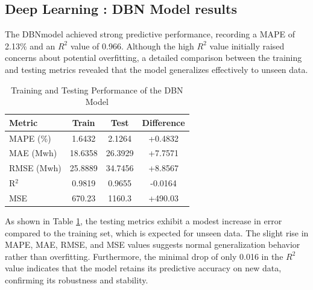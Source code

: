  \subsection{Deep Learning : DBN Model results \label{sec:dbn results}}
 The DBNmodel achieved strong predictive performance, recording a MAPE of 2.13\% and an $R^2$ value of 0.966. Although the high $R^2$ value initially raised concerns about potential overfitting, a detailed comparison between the training and testing metrics revealed that the model generalizes effectively to unseen data.
 \begin{table}[h!]
 	\centering
 	\caption{Training and Testing Performance of the DBN Model}
 	\label{tab:dbn_performance}
 	\begin{tabular}{lccc}
 		\hline
 		\textbf{Metric} & \textbf{Train} & \textbf{Test} & \textbf{Difference} \\ \hline
 		MAPE (\%) & 1.6432 & 2.1264 & +0.4832 \\
 		MAE (Mwh) & 18.6358 & 26.3929 & +7.7571 \\
 		RMSE (Mwh) & 25.8889 & 34.7456 & +8.8567 \\
 		R$^2$ & 0.9819 & 0.9655 & -0.0164 \\
 		MSE & 670.23 & 1160.3 & +490.03 \\ \hline
 	\end{tabular}
 \end{table}
  As shown in Table \ref{tab:dbn_performance}, the testing metrics exhibit a modest increase in error compared to the training set, which is expected for unseen data. The slight rise in MAPE, MAE, RMSE, and MSE values suggests normal generalization behavior rather than overfitting. Furthermore, the minimal drop of only 0.016 in the $R^2$ value indicates that the model retains its predictive accuracy on new data, confirming its robustness and stability.
